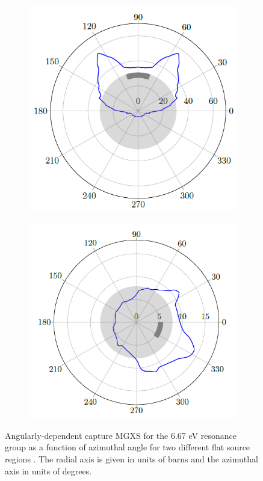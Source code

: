 \begin{figure}
\begin{subfigure}{.45\textwidth}
  \centering
  \includegraphics[width=0.8\linewidth]{figures/batman-1}
  \caption{}
  \label{fig:batman-plots-a}
\end{subfigure}
\begin{subfigure}{.45\textwidth}
  \centering
  \includegraphics[width=0.8\linewidth]{figures/batman-2}
  \caption{}
  \label{fig:batman-plots-b}
\end{subfigure}
\caption{Angularly-dependent capture MGXS for the 6.67 eV resonance group as a function of azimuthal angle for two different flat source regions \citep{gibson2016thesis}. The radial axis is given in units of barns and the azimuthal axis in units of degrees.}
\label{fig:batman-plots}
\end{figure}
